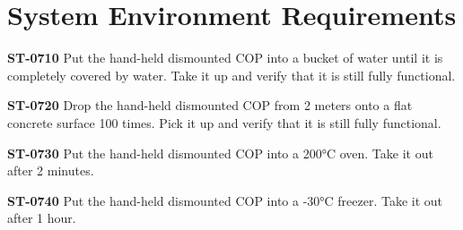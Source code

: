 \section{System Environment Requirements}

\textbf{ST-0710} Put the hand-held dismounted COP into a bucket of water until it is completely covered by water. Take it up and verify that it is still fully functional. 

\textbf{ST-0720} Drop the hand-held dismounted COP from 2 meters onto a flat concrete surface 100 times. Pick it up and verify that it is still fully functional. 

\textbf{ST-0730} Put the hand-held dismounted COP into a 200°C oven. Take it out after 2 minutes. 

\textbf{ST-0740} Put the hand-held dismounted COP into a -30°C freezer. Take it out after 1 hour. 


